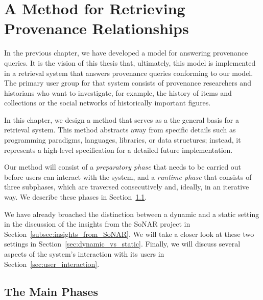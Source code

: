 \chapter{A Method for Retrieving Provenance Relationships}
\label{chap:retrieval}
\label{chap:method}

In the previous chapter, 
we have developed a model for answering provenance queries.
It is the vision of this thesis that, ultimately,
this model is implemented 
in a retrieval system
that answers provenance queries conforming to our model.
The primary user group for that system consists of provenance researchers
and historians who want to investigate, for example, the history of
items and collections or the social networks of historically important figures.

In this chapter, we design a method that serves
as a the general basis for a retrieval system.
This method abstracts away from specific details such as 
programming paradigms, languages, libraries, or data structures;
instead, it represents a high-level specification
for a detailed future implementation.

Our method will consist of a \emph{preparatory phase} that
needs to be carried out before users can interact with the system,
and a \emph{runtime phase} that consists of three subphases, which are
traversed consecutively and, ideally, in an iterative way.
We describe these phases in Section~\ref{sec:phases}.

We have already broached the distinction between a dynamic and a static setting
in the discussion of the insights from the \gls{SoNAR} project
in Section~\ref{subsec:insights_from_SoNAR}. 
We will take a closer look at these two settings in Section~\ref{sec:dynamic_vs_static}.
Finally, we will discuss several aspects of the system's interaction with its users
in Section~\ref{sec:user_interaction}.

\section{The Main Phases}
\label{sec:phases}

